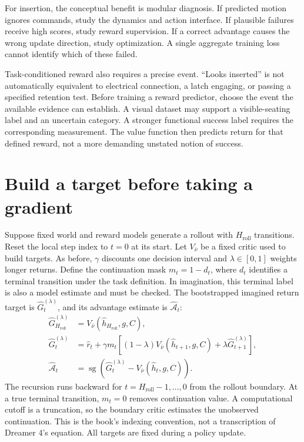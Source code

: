 For insertion, the conceptual benefit is modular diagnosis. If predicted motion ignores commands, study the dynamics and action interface. If plausible failures receive high scores, study reward supervision. If a correct advantage causes the wrong update direction, study optimization. A single aggregate training loss cannot identify which of these failed.

Task-conditioned reward also requires a precise event. ``Looks inserted'' is not automatically equivalent to electrical connection, a latch engaging, or passing a specified retention test. Before training a reward predictor, choose the event the available evidence can establish. A visual dataset may support a visible-seating label and an uncertain category. A stronger functional success label requires the corresponding measurement. The value function then predicts return for that defined reward, not a more demanding unstated notion of success.

\section{Build a target before taking a gradient}
Suppose fixed world and reward models generate a rollout with $H_{\mathrm{roll}}$ transitions. Reset the local step index to $t=0$ at its start. Let $V_{\bar\nu}$ be a fixed critic used to build targets. As before, $\gamma$ discounts one decision interval and $\lambda\in[0,1]$ weights longer returns. Define the continuation mask $m_t=1-d_t$, where $d_t$ identifies a terminal transition under the task definition. In imagination, this terminal label is also a model estimate and must be checked. The bootstrapped imagined return target is $\widehat G_t^{(\lambda)}$, and its advantage estimate is $\widehat{\mathcal A}_t$:
\begin{align}
 \widehat G_{H_{\mathrm{roll}}}^{(\lambda)}&=V_{\bar\nu}(\widehat h_{H_{\mathrm{roll}}},g,C),\nonumber\\
 \widehat G_t^{(\lambda)}&=\widehat r_t+\gamma m_t\left[(1-\lambda)V_{\bar\nu}(\widehat h_{t+1},g,C)
                                      +\lambda\widehat G_{t+1}^{(\lambda)}\right],\label{eq:middle-return}\\
 \widehat{\mathcal A}_t&=\operatorname{sg}\left(\widehat G_t^{(\lambda)}-V_{\bar\nu}(\widehat h_t,g,C)\right).
 \label{eq:middle-advantage}
\end{align}
The recursion runs backward for $t=H_{\mathrm{roll}}-1,\ldots,0$ from the rollout boundary. At a true terminal transition, $m_t=0$ removes continuation value. A computational cutoff is a truncation, so the boundary critic estimates the unobserved continuation. This is the book's indexing convention, not a transcription of Dreamer 4's equation. All targets are fixed during a policy update.

